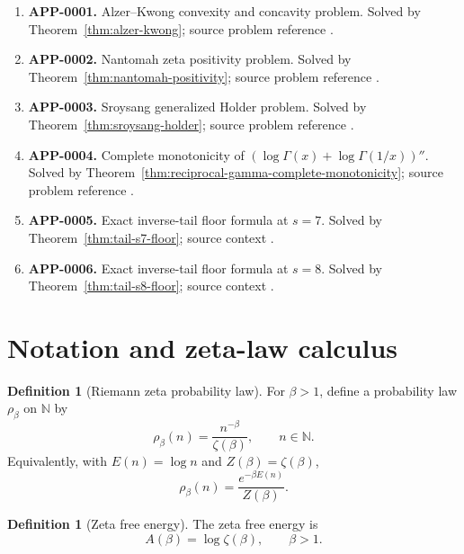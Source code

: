 \documentclass[11pt]{article}
\numberwithin{equation}{section}
\theoremstyle{definition}
\newtheorem{definition}[theorem]{Definition}
\theoremstyle{remark}
\newcommand{\N}{\mathbb N}
\newcommand{\1}{\mathbf 1}
\begin{document}
\begin{enumerate}
\item \textbf{APP-0001.} Alzer--Kwong convexity and concavity problem.  Solved by Theorem~\ref{thm:alzer-kwong}; source problem reference \cite{alzer-kwong}.
\item \textbf{APP-0002.} Nantomah zeta positivity problem.  Solved by Theorem~\ref{thm:nantomah-positivity}; source problem reference \cite{nantomah}.
\item \textbf{APP-0003.} Sroysang generalized Holder problem.  Solved by Theorem~\ref{thm:sroysang-holder}; source problem reference \cite{sroysang}.
\item \textbf{APP-0004.} Complete monotonicity of \((\log\Gamma(x)+\log\Gamma(1/x))''\).  Solved by Theorem~\ref{thm:reciprocal-gamma-complete-monotonicity}; source problem reference \cite{qi-lim-nantomah-polygamma}.
\item \textbf{APP-0005.} Exact inverse-tail floor formula at \(s=7\).  Solved by Theorem~\ref{thm:tail-s7-floor}; source context \cite{kim-song-tail,pan-wu-tail}.
\item \textbf{APP-0006.} Exact inverse-tail floor formula at \(s=8\).  Solved by Theorem~\ref{thm:tail-s8-floor}; source context \cite{kim-song-tail,pan-wu-tail}.
\end{enumerate}

\section{Notation and zeta-law calculus}

\begin{definition}[Riemann zeta probability law]
\label{def:zeta-law}
For \(\beta>1\), define a probability law \(\rho_\beta\) on \(\N\) by
\begin{equation}
\label{eq:zeta-law}
\rho_\beta(n)=\frac{n^{-\beta}}{\zeta(\beta)},\qquad n\in\N.
\end{equation}
Equivalently, with \(E(n)=\log n\) and \(Z(\beta)=\zeta(\beta)\),
\begin{equation}
\label{eq:gibbs-form}
\rho_\beta(n)=\frac{e^{-\beta E(n)}}{Z(\beta)}.
\end{equation}
\end{definition}

\begin{definition}[Zeta free energy]
\label{def:zeta-free-energy}
The zeta free energy is
\begin{equation}
\label{eq:zeta-free-energy}
A(\beta)=\log\zeta(\beta),\qquad \beta>1.
\end{equation}
\end{definition}
\end{document}
